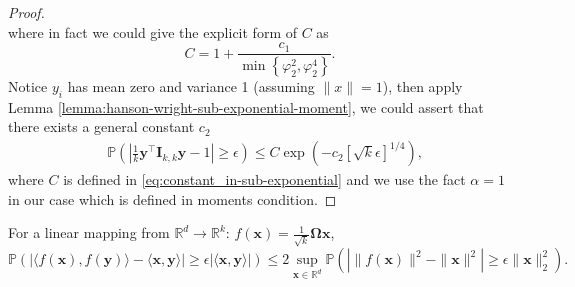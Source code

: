 \begin{proof}
\begin{equation}
	\end{equation}
	where in fact we could give the explicit form of $C$ as 
	\begin{equation}\label{eq:constant_in-sub-exponential}
	C = 1+ \frac{c_1}{\min\left\{\varphi_2^2, \varphi_2^4\right\}}. 
	\end{equation}
	Notice $y_i$ has mean zero and variance 1 (assuming $\|x\|=1$),  then apply Lemma \ref{lemma:hanson-wright-sub-exponential-moment}, we could assert that there exists a general constant $c_2$
	\begin{equation}
	\begin{aligned}
	& \mathbb{P}\left(\left|\frac{1}{k} \mathbf{y}^\top \mathbf{I}_{k,k} \mathbf{y}-1 \right|\ge \epsilon\right )  \le C\exp\left( - c_2 \left[\sqrt{k}\epsilon\right]^{1/4} \right),
	\nonumber 
	\end{aligned}
	\end{equation}
	where $C$ is defined in \eqref{eq:constant_in-sub-exponential} and we use the fact $\alpha=1$ in our case which is defined in moments condition. 
	
	
	
	
\end{proof}


\begin{lem}
\label{lemma:inner-product}
For a linear mapping from $\mathbb{R}^d\rightarrow \mathbb{R}^k$: $f(\mathbf{x}) = \frac{1}{\sqrt{k}}\mathbf{\Omega x}$, 
\begin{equation}
\label{eq:inner-bound}
\mathbb{P}(|\langle f(\mathbf{x}), f(\mathbf{y})\rangle - \langle \mathbf{x}, \mathbf{y}\rangle|\ge \epsilon |\langle \mathbf{x}, \mathbf{y}\rangle|) \le 2\sup_{\mathbf{x}\in \mathbb{R}^{d}}\mathbb{P}(| \|f(\mathbf{x})\|^2-\|\mathbf{x}\|^2|\ge \epsilon \|\mathbf{x}\|_2^2).\nonumber
\end{equation}
\end{lem}

